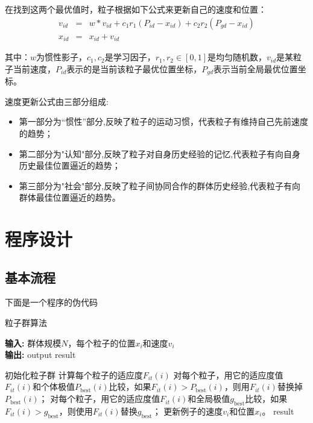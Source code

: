在找到这两个最优值时，粒子根据如下公式来更新自己的速度和位置：
\begin{eqnarray}
    v_{id}&=&w*v_{id}+c_{1}r_{1}\left(P_{id}-x_{id}\right)+c_{2}r_{2}\left(P_{gd}-x_{id}\right)\\
    x_{id}&=&x_{id}+v_{id}
\end{eqnarray}

其中：$w$为惯性影子，$c_{1},c_{2}$是学习因子，$r_{1},r_{2}\in{[0,1]}$是均匀随机数，$v_{id}$是某粒子当前速度，$P_{id}$表示的是当前该粒子最优位置坐标，$P_{gd}$表示当前全局最优位置坐标。

速度更新公式由三部分组成:
\begin{itemize}
    \item 第一部分为“惯性”部分,反映了粒子的运动习惯，代表粒子有维持自己先前速度的趋势；
    \item 第二部分为"认知"部分,反映了粒子对自身历史经验的记忆,代表粒子有向自身历史最佳位置逼近的趋势；
    \item 第三部分为"社会"部分,反映了粒子间协同合作的群体历史经验,代表粒子有向群体最佳位置逼近的趋势。
\end{itemize}
    

\section{程序设计}
\subsection{基本流程}
下面是一个程序的伪代码
\begin{center}
    \begin{minipage}{0.8\textwidth}
        \begin{algorithm}[H]%
            \caption{粒子群算法} %
            {\bf 输入:} %
            群体规模$N$，每个粒子的位置$x_{i}$和速度$v_{i}$\\
            {\bf 输出:} %
            output result
        \begin{algorithmic}[1]
            \State 初始化粒子群 %
                \State 计算每个粒子的适应度$F_{it}(i)$
                \State 对每个粒子，用它的适应度值$F_{it}(i)$和个体极值$P_{\text{best}}(i)$比较，如果$F_{it}(i)>P_{\text{best}}(i)$，则用$F_{it}(i)$替换掉$P_{\text{best}}(i)$；
                \State 对每个粒子，用它的适应度值$F_{it}(i)$和全局极值$g_{\text{best}}$比较，如果$F_{it}(i)>g_{\text{best}}$，则使用$F_{it}(i)$替换$g_{\text{best}}$；
                \State 更新例子的速度$v_{i}$和位置$x_{i}$。
            \EndWhile
            \State \Return result
            \end{algorithmic}
        \end{algorithm}
    \end{minipage}
    \label{algo:pso_algoritm}
\end{center}


